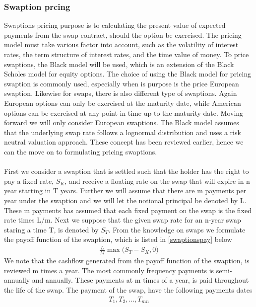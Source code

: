 \subsubsection{Swaption prcing}
Swaptions pricing purpose is to calculating the present value of expected payments from the swap contract,
should the option be exercised. The pricing model must take various factor into account, such as the
volatility of interest rates, the term structure of interest rates, and the time value of money. 
To price swaptions, the Black model will be used, which is an extension of the Black Scholes
model for equity options. The choice of using the Black model for pricing swaption is commonly used, especially when
is purpose is the price European swaption. Likewise for swaps, there is also different type of swaptions. 
Again European options can only be exercised at the maturity date, while American options can be exercised
at any point in time up to the maturity date. Moving forward we will only consider European swaptions. 
The Black model assumes that the underlying swap rate follows a lognormal distribution and uses a 
risk neutral valuation approach. These concept has been reviewed earlier, hence we can the move on to 
formulating pricing swaptions.
\\\\
First we consider a swaption that is settled such that the holder has the right to pay a fixed rate, $S_K$, 
and receive a floating rate on the swap that will expire in n year starting in T years.
Further we will assume that there are m payments 
per year under the swaption and we will let the notional principal be denoted by L. These m payments has
assumed that each fixed payment on the swap is the fixed rate times L/m. Next we suppose that 
the given swap rate for an n-year swap staring a time T, is denoted by $S_T$. 
From the knowledge on swaps we formulate the payoff function of the swaption, which is listed in
\autoref{swaptionspay} below
\begin{align}
    \frac{L}{M} \max \Big( S_T - S_K, 0 \Big)
    \label{swaptionspay}
\end{align}
We note that the cashflow generated from the payoff function of the swaption, is reviewed m times 
a year. The most commonly frequency payments is semi-annually and annually. These payments at m times
of a year, is paid throughout the life of the swap. The payment of the swap, have the following 
payments dates 
\begin{align*}
    T_1,T_2,...,T_{mn}
\end{align*}
